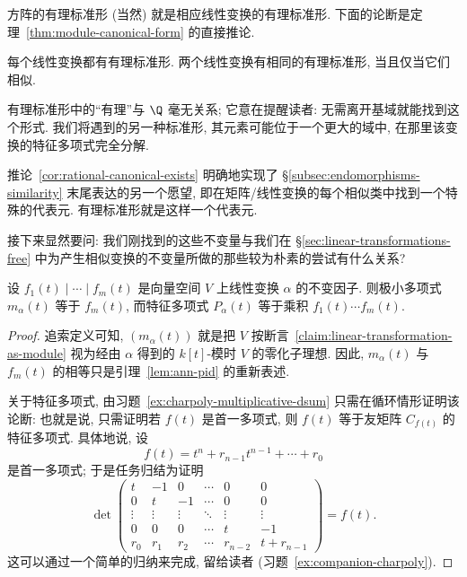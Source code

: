 方阵的有理标准形 (当然) 就是相应线性变换的有理标准形. 下面的论断是定理~\ref{thm:module-canonical-form} 的直接推论.

\begin{corollary}\label{cor:rational-canonical-exists}
每个线性变换都有有理标准形. 两个线性变换有相同的有理标准形, 当且仅当它们相似.
\end{corollary}

\begin{remark}\label{rmk:rational-name}
有理标准形中的``有理''与 $\Q$ 毫无关系; 它意在提醒读者: 无需离开基域就能找到这个形式. 我们将遇到的另一种标准形, 其元素可能位于一个更大的域中, 在那里该变换的特征多项式完全分解.
\end{remark}

推论~\ref{cor:rational-canonical-exists} 明确地实现了 §\ref{subsec:endomorphisms-similarity} 末尾表达的另一个愿望, 即在矩阵/线性变换的每个相似类中找到一个特殊的代表元. 有理标准形就是这样一个代表元.

接下来显然要问: 我们刚找到的这些不变量与我们在 §\ref{sec:linear-transformations-free} 中为产生相似变换的不变量所做的那些较为朴素的尝试有什么关系?

\begin{proposition}\label{prop:invariants-minimal-charpoly}
设 $f_1(t)\mid\cdots\mid f_m(t)$ 是向量空间 $V$ 上线性变换 $\alpha$ 的不变因子. 则极小多项式 $m_\alpha(t)$ 等于 $f_m(t)$, 而特征多项式 $P_\alpha(t)$ 等于乘积 $f_1(t)\cdots f_m(t)$.
\end{proposition}

\begin{proof}
追索定义可知, $(m_\alpha(t))$ 就是把 $V$ 按断言~\ref{claim:linear-transformation-as-module} 视为经由 $\alpha$ 得到的 $k[t]$-模时 $V$ 的零化子理想. 因此, $m_\alpha(t)$ 与 $f_m(t)$ 的相等只是引理~\ref{lem:ann-pid} 的重新表述.

关于特征多项式, 由习题~\ref{ex:charpoly-multiplicative-dsum} 只需在循环情形证明该论断: 也就是说, 只需证明若 $f(t)$ 是首一多项式, 则 $f(t)$ 等于友矩阵 $C_{f(t)}$ 的特征多项式. 具体地说, 设
\[
f(t)=t^n+r_{n-1}t^{n-1}+\cdots+r_0
\]
是首一多项式; 于是任务归结为证明
\[
\det\begin{pmatrix}
t&-1&0&\cdots&0&0\\
0&t&-1&\cdots&0&0\\
\vdots&\vdots&\vdots&\ddots&\vdots&\vdots\\
0&0&0&\cdots&t&-1\\
r_0&r_1&r_2&\cdots&r_{n-2}&t+r_{n-1}
\end{pmatrix}=f(t).
\]
这可以通过一个简单的归纳来完成, 留给读者 (习题~\ref{ex:companion-charpoly}).
\end{proof}

